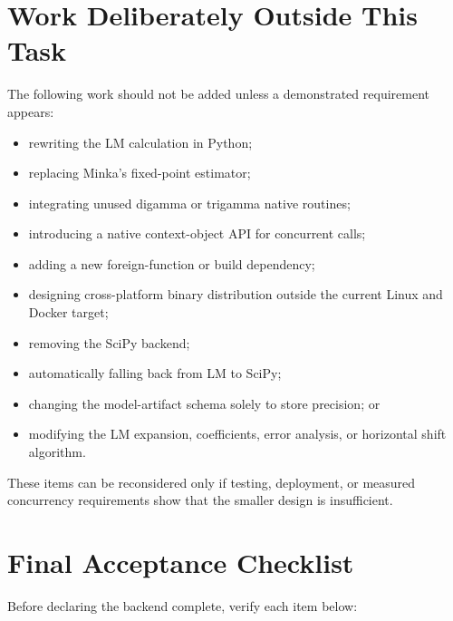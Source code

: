 \documentclass[11pt,a4paper]{article}
\begin{document}
\section{Work Deliberately Outside This Task}

The following work should not be added unless a demonstrated requirement
appears:

\begin{itemize}

\item rewriting the LM calculation in Python;

\item replacing Minka's fixed-point estimator;

\item integrating unused digamma or trigamma native routines;

\item introducing a native context-object API for concurrent calls;

\item adding a new foreign-function or build dependency;

\item designing cross-platform binary distribution outside the current Linux
and Docker target;

\item removing the SciPy backend;

\item automatically falling back from LM to SciPy;

\item changing the model-artifact schema solely to store precision; or

\item modifying the LM expansion, coefficients, error analysis, or horizontal
shift algorithm.

\end{itemize}

These items can be reconsidered only if testing, deployment, or measured
concurrency requirements show that the smaller design is insufficient.

\section{Final Acceptance Checklist}

Before declaring the backend complete, verify each item below:
\end{document}
